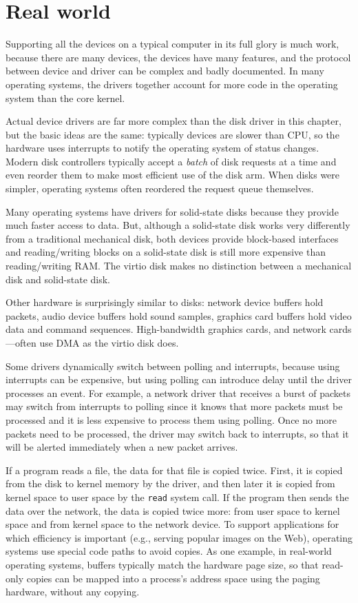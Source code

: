 \section{Real world}

Supporting all the devices on a typical computer in its full glory is
much work, because there are many devices, the devices have many
features, and the protocol between device and driver can be complex
and badly documented.
In many operating systems, the drivers together account for more code
in the operating system than the core kernel.

Actual device drivers are far more complex than the disk driver in this chapter,
but the basic ideas are the same:
typically devices are slower than CPU, so the hardware uses
interrupts to notify the operating system of status changes.
Modern disk controllers typically
accept a 
\textit{batch} 
of disk requests at a time and even reorder
them to make most efficient use of the disk arm.
When disks were simpler, operating systems often reordered the
request queue themselves.

Many operating systems have drivers for solid-state disks because they
provide much faster access to data.  But, although a solid-state disk
works very differently from a traditional mechanical disk, both
devices provide block-based interfaces and reading/writing blocks on a
solid-state disk is still more expensive than reading/writing RAM.
The virtio disk makes no distinction between a mechanical disk and
solid-state disk.

Other hardware is surprisingly similar to disks: network device
buffers hold packets, audio device buffers hold sound samples,
graphics card buffers hold video data and command sequences.
High-bandwidth graphics cards, and network cards—often use DMA
as the virtio disk does.

Some drivers dynamically switch between polling and interrupts, because using
interrupts can be expensive, but using polling can introduce delay until the
driver processes an event.  For example, a network driver that receives a
burst of packets may switch from interrupts to polling since it knows that more
packets must be processed and it is less expensive to process them using polling.
Once no more packets need to be processed, the driver may switch back to
interrupts, so that it will be alerted immediately when a new packet arrives.

If a program reads a file, the data for that file is copied twice.  First, it
is copied from the disk to kernel memory by the driver, and then later it is
copied from kernel space to user space by the 
\lstinline{read}
system call.  If the program then sends the data over the network, 
the data is copied twice more: from user space to kernel space and from
kernel space to the network device.  To support applications for which 
efficiency is important (e.g., serving popular images on the Web), operating systems
use special code paths to avoid copies.  As one example,
in real-world operating systems, 
buffers typically match the hardware page size, so that
read-only copies can be mapped into a process's address space
using the paging hardware, without any copying.

